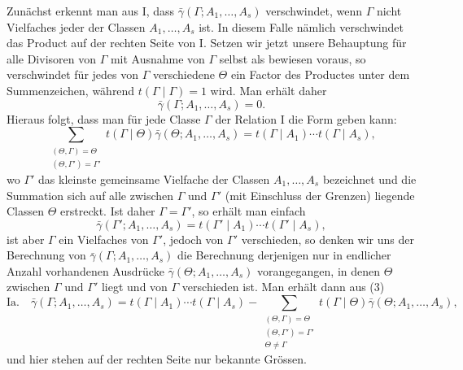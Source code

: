 \documentclass[11pt,a4paper]{article}
\begin{document}
Zunächst erkennt man aus I, dass $\bar\gamma(\Gamma;A_1,\ldots,A_s)$ verschwindet, wenn $\Gamma$ nicht Vielfaches jeder der Classen $A_1,\ldots,A_s$ ist. In diesem Falle nämlich verschwindet das Product auf der rechten Seite von I. Setzen wir jetzt unsere Behauptung für alle Divisoren von $\Gamma$ mit Ausnahme von $\Gamma$ selbst als bewiesen voraus, so verschwindet für jedes von $\Gamma$ verschiedene $\Theta$ ein Factor des Productes unter dem Summenzeichen, während $t(\Gamma\mid\Gamma)=1$ wird. Man erhält daher
\[
 \bar\gamma(\Gamma;A_1,\ldots,A_s)=0.
\]
Hieraus folgt, dass man für jede Classe $\Gamma$ der Relation I die Form geben kann:
\begin{equation}
 \sum_{\substack{(\Theta,\Gamma)=\Theta\\(\Theta,\Gamma')=\Gamma'}}
 t(\Gamma\mid\Theta)\bar\gamma(\Theta;A_1,\ldots,A_s)
 =t(\Gamma\mid A_1)\cdots t(\Gamma\mid A_s),
\tag{3}
\end{equation}
wo $\Gamma'$ das kleinste gemeinsame Vielfache der Classen $A_1,\ldots,A_s$ bezeichnet und die Summation sich auf alle zwischen $\Gamma$ und $\Gamma'$ (mit Einschluss der Grenzen) liegende Classen $\Theta$ erstreckt. Ist daher $\Gamma=\Gamma'$, so erhält man einfach
\[
 \bar\gamma(\Gamma';A_1,\ldots,A_s)=t(\Gamma'\mid A_1)\cdots t(\Gamma'\mid A_s),
\]
ist aber $\Gamma$ ein Vielfaches von $\Gamma'$, jedoch von $\Gamma'$ verschieden, so denken wir uns der Berechnung von $\bar\gamma(\Gamma;A_1,\ldots,A_s)$ die Berechnung derjenigen nur in endlicher Anzahl vorhandenen Ausdrücke $\bar\gamma(\Theta;A_1,\ldots,A_s)$ vorangegangen, in denen $\Theta$ zwischen $\Gamma$ und $\Gamma'$ liegt und von $\Gamma$ verschieden ist. Man erhält dann aus (3)
\[
\text{Ia.}\quad
 \bar\gamma(\Gamma;A_1,\ldots,A_s)
 =t(\Gamma\mid A_1)\cdots t(\Gamma\mid A_s)
 -\sum_{\substack{(\Theta,\Gamma)=\Theta\\(\Theta,\Gamma')=\Gamma'\\\Theta\ne\Gamma}}
 t(\Gamma\mid\Theta)\bar\gamma(\Theta;A_1,\ldots,A_s),
\]
und hier stehen auf der rechten Seite nur bekannte Grössen.
\end{document}

